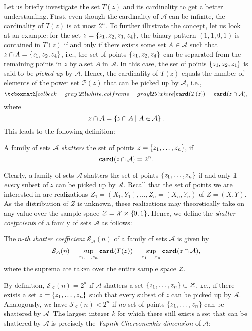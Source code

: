 Let us briefly investigate the set $T(z)$ and its cardinality to get a better understanding. First, even though the cardinality of $\mathcal{A}$ can be infinite, the cardinality of $T(z)$ is at most $2^n$. To further illustrate the concept, let us look at an example: for the set $z = \left\{z_1, z_2, z_3, z_4\right\}$, the binary pattern $(1, 1, 0, 1)$ is contained in $T(z)$ if and only if there exists some set $A \in \mathcal{A}$ such that $z \cap A = \left\{z_1, z_2, z_4\right\}$, i.e., the set of points $\left\{z_1, z_2, z_4\right\}$ can be separated from the remaining points in $z$ by a set $A$ in $\mathcal{A}$. In this case, the set of points $\left\{z_1, z_2, z_4\right\}$ is said to be \emph{picked up} by $\mathcal{A}$. Hence, the cardinality of $T(z)$ equals the number of elements of the power set $\mathcal{P}(z)$ that can be picked up by $\mathcal{A}$, i.e.,
\[
    \highlightMath{
        \card{T(z)} = \card{z \cap \mathcal{A}},
    }
\]
where
\[
    z \cap \mathcal{A} = \left\{ z \cap A \mathrel{|} A \in \mathcal{A}\right\}.
\]
This leads to the following definition:

\begin{definition}
A family of sets $\mathcal{A}$ \emph{shatters} the set of points $z = \left\{z_1, \dots, z_n\right\}$, if
\[
    \mathrm{\mathbf{card}}(z \cap \mathcal{A}) = 2^n.
\]
\end{definition}

Clearly, a family of sets $\mathcal{A}$ shatters the set of points $\left\{z_1, \dots, z_n\right\}$ if and only if \emph{every} subset of $z$ can be picked up by $\mathcal{A}$. Recall that the set of points we are interested in are realizations $Z_1 = (X_1, Y_1), \dots, Z_n = (X_n, Y_n)$ of $Z = (X, Y)$. As the distribution of $Z$ is unknown, these realizations may theoretically take on any value over the sample space $\mathcal{Z} = \mathcal{X} \times \left\{0, 1\right\}$. Hence, we define the \emph{shatter coefficients} of a family of sets $\mathcal{A}$ as follows:

\begin{definition}
The \emph{$n$-th shatter coefficient} $\mathcal{S}_{\mathcal{A}}(n)$ of a family of sets $\mathcal{A}$ is given by
\[
    \mathcal{S}_{\mathcal{A}}(n) = \sup_{z_1, \dots, z_n} \mathrm{\mathbf{card}}(T(z)) = \sup_{z_1, \dots, z_n} \mathrm{\mathbf{card}}(z \cap \mathcal{A}),
\]
where the suprema are taken over the entire sample space $\mathcal{Z}$.
\end{definition}

By definition, $\mathcal{S}_{\mathcal{A}}(n) = 2^n$ if $\mathcal{A}$ shatters a set $\left\{z_1, \dots, z_n\right\} \subset \mathcal{Z}$, i.e., if there exists a set $z = \left\{z_1, \dots, z_n\right\}$ such that every subset of $z$ can be picked up by $\mathcal{A}$. Analogously, we have $\mathcal{S}_{\mathcal{A}}(n) < 2^n$ if \emph{no} set of points $\left\{z_1, \dots, z_n\right\}$ can be shattered by $\mathcal{A}$. The largest integer $k$ for which there still exists a set that can be shattered by $\mathcal{A}$ is precisely the \emph{Vapnik-Chervonenkis dimension} of $\mathcal{A}$:

